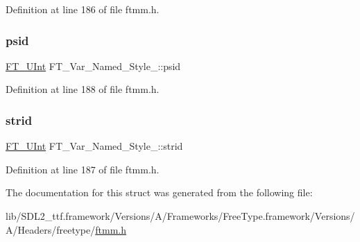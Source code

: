 Definition at line 186 of file ftmm.\+h.

\mbox{\label{struct_f_t___var___named___style___a91b36c5ad8302f454399b6091c5ce170}} 
\subsubsection{\texorpdfstring{psid}{psid}}
{\footnotesize\ttfamily \mbox{\hyperlink{fttypes_8h_abcb8db4dbf35d2b55a9e8c7b0926dc52}{F\+T\+\_\+\+U\+Int}} F\+T\+\_\+\+Var\+\_\+\+Named\+\_\+\+Style\+\_\+\+::psid}



Definition at line 188 of file ftmm.\+h.

\mbox{\label{struct_f_t___var___named___style___a7802f6958c6e883bdce16b9931002826}} 
\subsubsection{\texorpdfstring{strid}{strid}}
{\footnotesize\ttfamily \mbox{\hyperlink{fttypes_8h_abcb8db4dbf35d2b55a9e8c7b0926dc52}{F\+T\+\_\+\+U\+Int}} F\+T\+\_\+\+Var\+\_\+\+Named\+\_\+\+Style\+\_\+\+::strid}



Definition at line 187 of file ftmm.\+h.



The documentation for this struct was generated from the following file\+:\begin{DoxyCompactItemize}
\item 
lib/\+S\+D\+L2\+\_\+ttf.\+framework/\+Versions/\+A/\+Frameworks/\+Free\+Type.\+framework/\+Versions/\+A/\+Headers/freetype/\mbox{\hyperlink{ftmm_8h}{ftmm.\+h}}\end{DoxyCompactItemize}
